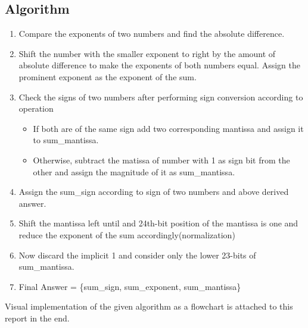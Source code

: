 \documentclass[11pt]{article}
\begin{document}
    \subsection{Algorithm}
    \begin{enumerate}
        \item Compare the exponents of two numbers and find the absolute difference.
        \item Shift the number with the smaller exponent to right by the amount of absolute difference to make the exponents of both numbers equal. Assign the prominent exponent as the exponent of the sum.
        \item Check the signs of two numbers after performing sign conversion according to operation
        \begin{itemize}
            \item If both are of the same sign add two corresponding mantissa and assign it to sum\_mantissa.
            \item Otherwise, subtract the matissa of number with 1 as sign bit from the other and assign the magnitude of it as sum\_mantissa.
        \end{itemize}
        \item Assign the sum\_sign according to sign of two numbers and above derived answer.
        \item Shift the mantissa left until and 24th-bit position of the mantissa is one and reduce the exponent of the sum accordingly(normalization)
        \item Now discard the implicit 1 and consider only the lower 23-bits of sum\_mantissa.
        \item Final Answer = \{sum\_sign, sum\_exponent, sum\_mantissa\}
    \end{enumerate}
    Visual implementation of the given algorithm as a flowchart is attached to this report in the end.
\end{document}

